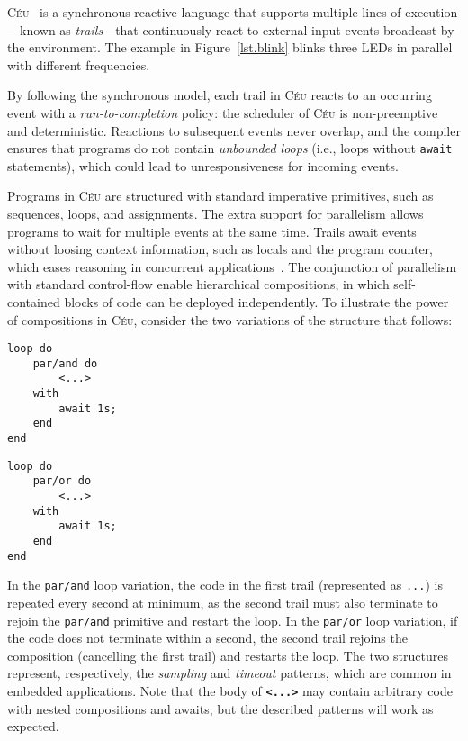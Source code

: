 \documentclass[pdftex,12pt,a4paper]{article}
\newcommand{\CEU}{\textsc{C\'{e}u}\xspace}
\newcommand{\code}[1] {{\small{\texttt{#1}}}}
\begin{document}
\CEU~\cite{ceu.sensys13,ceu.phd,ceu.rem13,ceu.tr} is a synchronous reactive 
language that supports multiple lines of execution---known as 
\emph{trails}---that continuously react to external input events broadcast by 
the environment.
%
The example in Figure~\ref{lst.blink} blinks three LEDs in parallel with 
different frequencies.

By following the synchronous model, each trail in \CEU reacts to an occurring 
event with a \emph{run-to-completion} policy: the scheduler of \CEU is 
non-preemptive and deterministic.
%
Reactions to subsequent events never overlap, and the compiler ensures that 
programs do not contain \emph{unbounded loops} (i.e., loops without 
\code{await} statements), which could lead to unresponsiveness for incoming 
events.
%

Programs in \CEU are structured with standard imperative primitives, such as 
sequences, loops, and assignments.
The extra support for parallelism allows programs to wait for multiple events 
at the same time.
Trails await events without loosing context information, such as locals and the 
program counter, which eases reasoning in concurrent 
applications~\cite{sync_async.cooperative}.
%
The conjunction of parallelism with standard control-flow enable hierarchical 
compositions, in which self-contained blocks of code can be deployed 
independently.
%
To illustrate the power of compositions in \CEU, consider the two variations of 
the structure that follows:

\begin{minipage}[t]{0.35\linewidth}
\begin{lstlisting}
loop do
    par/and do
        <...>
    with
        await 1s;
    end
end
\end{lstlisting}
\end{minipage}
%
\hspace{1cm}
%
\begin{minipage}[t]{0.35\linewidth}
\begin{lstlisting}
loop do
    par/or do
        <...>
    with
        await 1s;
    end
end
\end{lstlisting}
\end{minipage}

In the \code{par/and} loop variation, the code in the first trail (represented 
as \code{...}) is repeated every second at minimum, as the second trail must 
also terminate to rejoin the \code{par/and} primitive and restart the loop.
%
In the \code{par/or} loop variation, if the code does not terminate within a 
second, the second trail rejoins the composition (cancelling the first trail) 
and restarts the loop.
%
The two structures represent, respectively, the \emph{sampling} and 
\emph{timeout} patterns, which are common in embedded applications.
%
Note that the body of \textbf{\code{<...>}} may contain arbitrary code with 
nested compositions and awaits, but the described patterns will work as 
expected.
\end{document}

